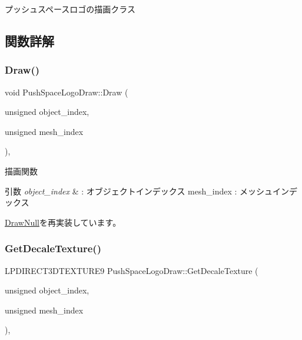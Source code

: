 プッシュスペースロゴの描画クラス 

\subsection{関数詳解}
\mbox{\label{class_push_space_logo_draw_a647dddefc43d66cb3c720ee8fbb6a783}} 
\subsubsection{\texorpdfstring{Draw()}{Draw()}}
{\footnotesize\ttfamily void Push\+Space\+Logo\+Draw\+::\+Draw (\begin{DoxyParamCaption}\item[{unsigned}]{object\+\_\+index,  }\item[{unsigned}]{mesh\+\_\+index }\end{DoxyParamCaption})\hspace{0.3cm}{\ttfamily [override]}, {\ttfamily [virtual]}}



描画関数 


\begin{DoxyParams}{引数}
{\em object\+\_\+index} & \+: オブジェクトインデックス mesh\+\_\+index \+: メッシュインデックス \\
\hline
\end{DoxyParams}


\mbox{\hyperlink{class_draw_null_afe50f6fd820b18d673f70f048743f339}{Draw\+Null}}を再実装しています。

\mbox{\label{class_push_space_logo_draw_a4990a9f5662af324f2632e8647cbdde4}} 
\subsubsection{\texorpdfstring{Get\+Decale\+Texture()}{GetDecaleTexture()}}
{\footnotesize\ttfamily L\+P\+D\+I\+R\+E\+C\+T3\+D\+T\+E\+X\+T\+U\+R\+E9 Push\+Space\+Logo\+Draw\+::\+Get\+Decale\+Texture (\begin{DoxyParamCaption}\item[{unsigned}]{object\+\_\+index,  }\item[{unsigned}]{mesh\+\_\+index }\end{DoxyParamCaption})\hspace{0.3cm}{\ttfamily [override]}, {\ttfamily [virtual]}}



